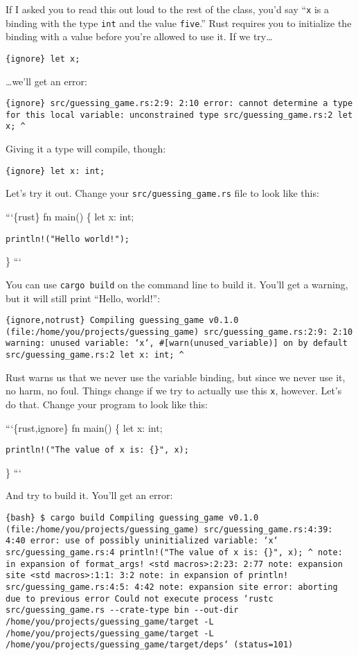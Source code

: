\documentclass[]{article}
\begin{document}
If I asked you to read this out loud to the rest of the class, you'd say
``\texttt{x} is a binding with the type \texttt{int} and the value
\texttt{five}.'' Rust requires you to initialize the binding with a
value before you're allowed to use it. If we try\ldots{}

\texttt{\{ignore\} let x;}

\ldots{}we'll get an error:

\texttt{\{ignore\} src/guessing\_game.rs:2:9: 2:10 error: cannot determine a type for this local variable: unconstrained type src/guessing\_game.rs:2     let x;                                \^{}}

Giving it a type will compile, though:

\texttt{\{ignore\} let x: int;}

Let's try it out. Change your \texttt{src/guessing\_game.rs} file to
look like this:

```\{rust\} fn main() \{ let x: int;

\begin{verbatim}
println!("Hello world!");
\end{verbatim}

\} ```

You can use \texttt{cargo build} on the command line to build it. You'll
get a warning, but it will still print ``Hello, world!'':

\texttt{\{ignore,notrust\}    Compiling guessing\_game v0.1.0 (file:/home/you/projects/guessing\_game) src/guessing\_game.rs:2:9: 2:10 warning: unused variable: `x`, \#{[}warn(unused\_variable){]} on by default src/guessing\_game.rs:2     let x: int;                                \^{}}

Rust warns us that we never use the variable binding, but since we never
use it, no harm, no foul. Things change if we try to actually use this
\texttt{x}, however. Let's do that. Change your program to look like
this:

```\{rust,ignore\} fn main() \{ let x: int;

\begin{verbatim}
println!("The value of x is: {}", x);
\end{verbatim}

\} ```

And try to build it. You'll get an error:

\texttt{\{bash\} \$ cargo build    Compiling guessing\_game v0.1.0 (file:/home/you/projects/guessing\_game) src/guessing\_game.rs:4:39: 4:40 error: use of possibly uninitialized variable: `x` src/guessing\_game.rs:4     println!("The value of x is: \{\}", x);                                                              \^{} note: in expansion of format\_args! \textless{}std macros\textgreater{}:2:23: 2:77 note: expansion site \textless{}std macros\textgreater{}:1:1: 3:2 note: in expansion of println! src/guessing\_game.rs:4:5: 4:42 note: expansion site error: aborting due to previous error Could not execute process `rustc src/guessing\_game.rs -\/-crate-type bin -\/-out-dir /home/you/projects/guessing\_game/target -L /home/you/projects/guessing\_game/target -L /home/you/projects/guessing\_game/target/deps` (status=101)}
\end{document}
